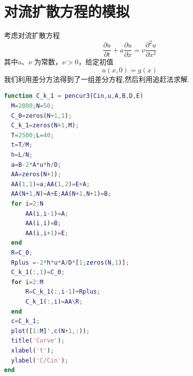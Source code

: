 \section{对流扩散方程的模拟}
考虑对流扩散方程
\begin{equation}\label{equ:cf_dkfangc}
	\dfrac{\partial u}{\partial t}+a\dfrac{\partial u}{\partial x}=\nu\dfrac{\partial^2 u}{\partial x^2}
\end{equation}
其中a、$\nu$ 为常数，$\nu>0$，给定初值
\begin{equation}
	u(x,0)=g(x)
\end{equation}
我们利用差分方法得到了一组差分方程,然后利用追赶法求解.
\begin{lstlisting}[caption=对流扩散方程差分求解,language=Matlab]
function C_k_1 = pencur3(Cin,u,A,B,D,E)
  M=2000;N=50;
  C_0=zeros(N+1,1);
  C_k_1=zeros(N+1,M);
  T=2500;L=40;
  t=T/M;
  h=L/N;
  a=B-2*A*u*h/D;
  AA=zeros(N+1);
  AA(1,1)=a;AA(1,2)=E+A;
  AA(N+1,N)=A+E;AA(N+1,N+1)=B;
  for i=2:N
      AA(i,i-1)=A;
      AA(i,i)=B;
      AA(i,i+1)=E;	
  end
  R=C_0;
  Rplus =-2*h*u*A/D*[1;zeros(N,1)];
  C_k_1(:,1)=C_0;
  for i=2:M
      R=C_k_1(:,i-1)+Rplus;
      C_k_1(:,i)=AA\R;
  end
  c=C_k_1;
  plot([1:M]',c(N+1,:));
  title('Curve');
  xlabel('t');
  ylabel('C/Cin');
end
\end{lstlisting}

